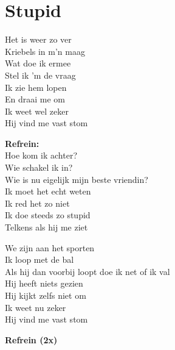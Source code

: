 \section{Stupid}
Het is weer zo ver\\
Kriebels in m'n maag\\
Wat doe ik ermee\\
Stel ik 'm de vraag\\
Ik zie hem lopen\\
En draai me om \\
Ik weet wel zeker\\
Hij vind me vast stom

\textbf{Refrein:}\\
Hoe kom ik achter?\\
Wie schakel ik in?\\
Wie is nu eigelijk mijn beste vriendin?\\ 
Ik moet het echt weten \\
Ik red het zo niet\\
Ik doe steeds zo stupid\\
Telkens als hij me ziet

We zijn aan het sporten\\
Ik loop met de bal\\
Als hij dan voorbij loopt doe ik net of ik val\\
Hij heeft niets gezien\\
Hij kijkt zelfs niet om \\
Ik weet nu zeker\\
Hij vind me vast stom

\textbf{Refrein (2x)}
